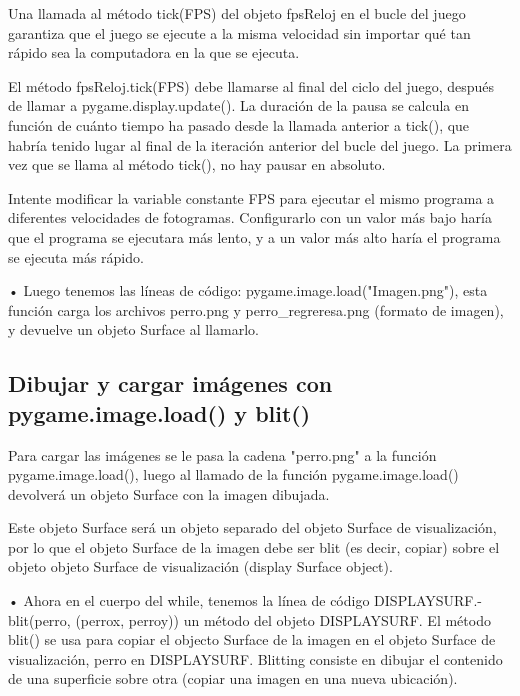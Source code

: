 Una llamada al método {\ttfamily tick(FPS)} del objeto {\ttfamily fpsReloj} en el bucle del juego  garantiza que el juego se ejecute a la misma velocidad sin importar qué tan rápido sea la computadora en la que se ejecuta.

El método  {\ttfamily fpsReloj.tick(FPS)}   debe llamarse al final del ciclo del juego, después de
llamar a {\ttfamily pygame.display.update()}. La duración de la pausa se calcula en función de cuánto tiempo ha pasado desde la llamada anterior a {\ttfamily tick()}, que habría tenido lugar al final de la iteración anterior del bucle del juego. La primera vez que se llama al método  {\ttfamily tick()}, no hay pausar en absoluto. 


Intente modificar la variable constante FPS para ejecutar el mismo programa a diferentes velocidades de fotogramas.
Configurarlo  con un valor más bajo haría que el programa se ejecutara más lento, y a un valor más alto haría
el programa se ejecuta más rápido.


• Luego tenemos las líneas de código: {\ttfamily  pygame.image.load("{}Imagen.png"{})}, esta función  carga los archivos {\ttfamily perro.png} y {\ttfamily perro\_regreresa.png} (formato de imagen),  y devuelve un objeto Surface al llamarlo.


\subsection{Dibujar y cargar imágenes con pygame.image.load() y blit()}\label{blit}

 
Para cargar  las imágenes se le pasa la  cadena  {\ttfamily "{}perro.png"{}} a la función {\ttfamily pygame.image.load()}, 
luego al llamado de la función {\ttfamily pygame.image.load()} devolverá un objeto Surface con la imagen dibujada. 

Este objeto Surface será un objeto  separado del objeto Surface de visualización, por lo que  el objeto Surface de la imagen
debe ser blit (es decir, copiar) sobre el objeto objeto Surface de visualización (display Surface object).

• Ahora en el cuerpo del {\ttfamily while}, tenemos la línea de código {\ttfamily DISPLAYSURF.-\\ blit(perro, (perrox, perroy))} un método del objeto {\ttfamily  DISPLAYSURF}. El método {\ttfamily blit()} se usa para copiar el objecto Surface de la imagen en el objeto Surface de visualización,  {\ttfamily perro} en   {\ttfamily DISPLAYSURF}.  Blitting consiste en dibujar el contenido de una superficie sobre otra (copiar una imagen en una nueva ubicación). 

